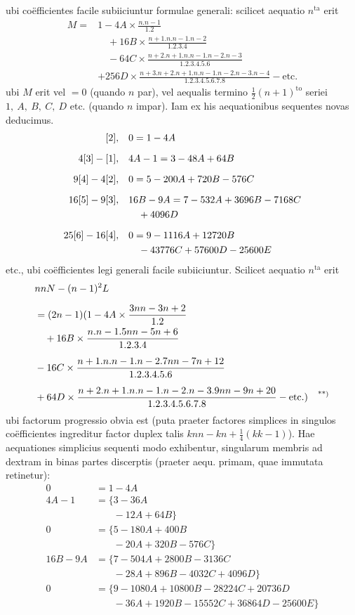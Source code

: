 ubi co\"efficientes facile subiiciuntur formulae generali: scilicet aequatio \(n^{\mathrm{ta}}\) erit
\[
\begin{aligned}
M={}&1-4A\times\frac{n.n-1}{1.2}\\&\quad+16B\times\frac{n+1.n.n-1.n-2}{1.2.3.4}\\&\quad-64C\times\frac{n+2.n+1.n.n-1.n-2.n-3}{1.2.3.4.5.6}\\[6pt]
&+256D\times\frac{n+3.n+2.n+1.n.n-1.n-2.n-3.n-4}{1.2.3.4.5.6.7.8}-\text{etc.}
\end{aligned}
\]
ubi \(M\) erit vel \(=0\) (quando \(n\) par), vel aequalis termino \(\frac12(n+1)^{\mathrm{to}}\) seriei
\(1,\ A,\ B,\ C,\ D\) etc. (quando \(n\) impar). Iam ex his aequationibus sequentes novas deducimus.
\[
\begin{aligned}
\relax [2],\quad&0=1-4A\\[6pt]
4[3]-[1],\quad&4A-1=3-48A+64B\\[6pt]
9[4]-4[2],\quad&0=5-200A+720B-576C\\[6pt]
16[5]-9[3],\quad&16B-9A=7-532A+3696B-7168C\\&\quad+4096D\\[6pt]
25[6]-16[4],\quad&0=9-1116A+12720B\\&\quad-43776C+57600D-25600E
\end{aligned}
\]
etc., ubi co\"efficientes legi generali facile subiiciuntur. Scilicet aequatio \(n^{\mathrm{ta}}\) erit
\[
\begin{aligned}
&nnN-(n-1)^2L\\[6pt]&=(2n-1)(1-4A\times\frac{3nn-3n+2}{1.2}
\\&\quad+16B\times\frac{n.n-1.5nn-5n+6}{1.2.3.4}\\[6pt]
&-16C\times\frac{n+1.n.n-1.n-2.7nn-7n+12}{1.2.3.4.5.6}\\[6pt]
&+64D\times\frac{n+2.n+1.n.n-1.n-2.n-3.9nn-9n+20}{1.2.3.4.5.6.7.8}-\text{etc.})\quad\text{\textsuperscript{**)}}
\end{aligned}
\]\begingroup\renewcommand{\thefootnote}{**)}\endgroup
ubi factorum progressio obvia est (puta praeter factores simplices in singulos co\"efficientes ingreditur factor duplex talis \(knn-kn+\frac14(kk-1)\)). Hae aequationes
simplicius sequenti modo exhibentur, singularum membris ad dextram in binas
partes discerptis (praeter aequ. primam, quae immutata retinetur):
\[
\begin{aligned}
0&=1-4A\\[6pt]
4A-1&=\{3-36A\\[6pt]
&\phantom{=\{}-12A+64B\}\\[6pt]
0&=\{5-180A+400B\\[6pt]
&\phantom{=\{}-20A+320B-576C\}\\[6pt]
16B-9A&=\{7-504A+2800B-3136C\\[6pt]
&\phantom{=\{}-28A+896B-4032C+4096D\}\\[6pt]
0&=\{9-1080A+10800B-28224C+20736D\\[6pt]
&\phantom{=\{}-36A+1920B-15552C+36864D-25600E\}
\end{aligned}
\]
